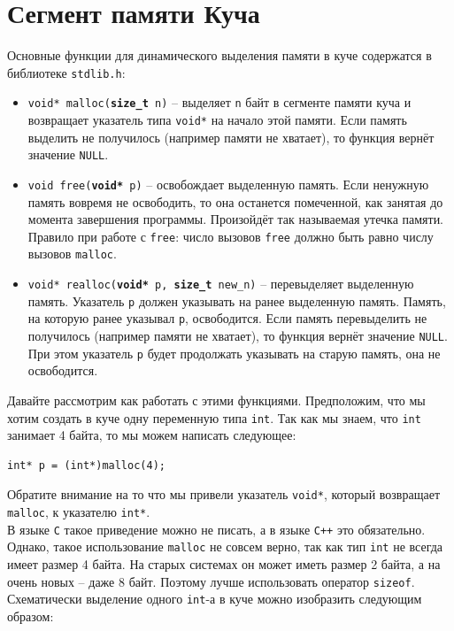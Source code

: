\documentclass[10pt]{article}
\begin{document}
\newpage
\section*{Сегмент памяти Куча}
Основные функции для динамического выделения памяти в куче содержатся в библиотеке \texttt{stdlib.h}:
\begin{itemize}
\item \texttt{void* malloc(\textbf{size\_t} n)} -- выделяет \texttt{n} байт в сегменте памяти куча и возвращает указатель типа \texttt{void*} на начало этой памяти. Если память выделить не получилось (например памяти не хватает), то функция вернёт значение \texttt{NULL}.
\item \texttt{void free(\textbf{void*} p)} -- освобождает выделенную память. Если ненужную память вовремя не освободить, то она останется помеченной, как занятая до момента завершения программы. Произойдёт так называемая утечка памяти. Правило при работе с \texttt{free}: число вызовов \texttt{free} должно быть равно числу вызовов \texttt{malloc}.
\item \texttt{void* realloc(\textbf{void*} p, \textbf{size\_t} new\_n)} -- перевыделяет выделенную память. Указатель \texttt{p} должен указывать на ранее выделенную память. Память, на которую ранее указывал \texttt{p}, освободится.
Если память перевыделить не получилось (например памяти не хватает), то функция вернёт значение \texttt{NULL}. При этом указатель \texttt{p} будет продолжать указывать на старую память, она не освободится.\\
\end{itemize}
Давайте рассмотрим как работать с этими функциями. Предположим, что мы хотим создать в куче одну переменную типа \texttt{int}. Так как мы знаем, что \texttt{int} занимает 4 байта, то мы можем написать следующее:
\begin{lstlisting}
int* p = (int*)malloc(4);
\end{lstlisting}
Обратите внимание на то что мы привели указатель \texttt{void*}, который возвращает \texttt{malloc}, к указателю \texttt{int*}.\\
В языке \texttt{C} такое приведение можно не писать, а в языке \texttt{C++} это обязательно. Однако, такое использование \texttt{malloc} не совсем верно, так как тип \texttt{int} не всегда имеет размер 4 байта. На старых системах он может иметь размер 2 байта, а на очень новых -- даже 8 байт. Поэтому лучше использовать оператор \texttt{sizeof}.\\

\noindent Схематически выделение одного \texttt{int}-а в куче можно изобразить следующим образом:
 
\end{document}
